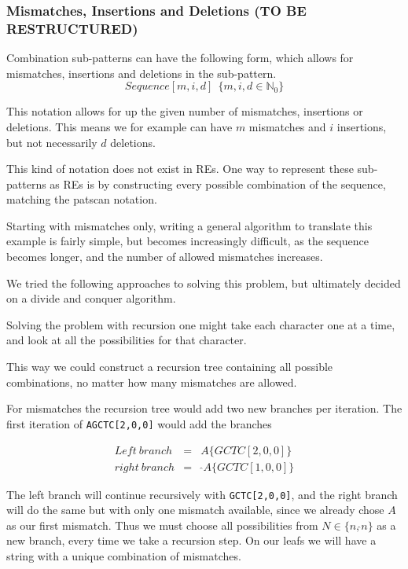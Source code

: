 \documentclass[12pt]{article}
\theoremstyle{definition}
\newcounter{subsubsubsection}[subsubsection]
\begin{document}
\subsubsection{Mismatches, Insertions and Deletions (TO BE RESTRUCTURED)}

Combination sub-patterns can have the following form, which allows for mismatches, insertions and deletions in the sub-pattern. 
\begin{equation}
	Sequence[m, i, d] \ \ \{m, i, d \in \mathbb{N}_0 \}
\end{equation} 

This notation allows for up the given number of mismatches, insertions or deletions. This means we for example can have $m$ mismatches and $i$ insertions, but not necessarily $d$ deletions.

This kind of notation does not exist in REs. One way to represent these sub-patterns as REs is by constructing every possible combination of the sequence, matching the patscan notation.

Starting with mismatches only, writing a general algorithm to translate this example is fairly simple, but becomes increasingly difficult, as the sequence becomes longer, and the number of allowed mismatches increases.

We tried the following approaches to solving this problem, but ultimately decided on a divide and conquer algorithm. 


Solving the problem with recursion one might take each character one at a time, and look at all the possibilities for that character.

This way we could construct a recursion tree containing all possible combinations, no matter how many mismatches are allowed.

For mismatches the recursion tree would add two new branches per iteration. The first iteration of \texttt{AGCTC[2,0,0]} would add the branches

\begin{eqnarray}
	Left\ branch &=& A\{GCTC[2,0,0]\} \\
	right\ branch &=&\ \hat{}A\{GCTC[1,0,0]\}
\end{eqnarray}

The left branch will continue recursively with \texttt{GCTC[2,0,0]}, and the right branch will do the same but with only one mismatch available, since we already chose $A$ as our first mismatch. Thus we must choose all possibilities from $N \in \{n, \hat{}n\}$ as a new branch, every time we take a recursion step.
On our leafs we will have a string with a unique combination of mismatches.
\end{document}
